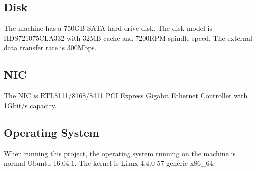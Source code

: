 \subsection{Disk}
The machine has a 750GB SATA hard drive disk. The disk model is HDS721075CLA332 with 32MB cache and 7200RPM spindle speed. The external data transfer rate is 300Mbps.

\subsection{NIC}

The NIC is RTL8111/8168/8411 PCI Express Gigabit Ethernet Controller with 1Gbit/s capacity.

\subsection{Operating System}
When running this project, the operating system running on the machine is normal Ubuntu 16.04.1. The kernel is Linux 4.4.0-57-generic x86\_64.
